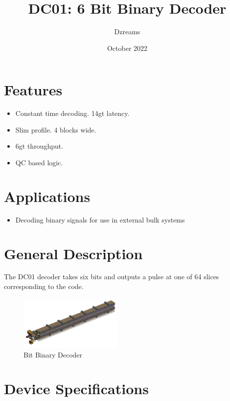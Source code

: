 \documentclass[10pt]{datasheet}
\title{DC01: 6 Bit Binary Decoder}
\author{Dzreams}
\date{October 2022}
\begin{document}
\maketitle

\section{Features}

\begin{itemize}
\item{Constant time decoding. 14gt latency.}
\item{Slim profile. 4 blocks wide.}
\item{6gt throughput.}
\item{QC based logic.}
\end{itemize}

\section{Applications}

\begin{itemize}
\item{Decoding binary signals for use in external bulk systems}
\end{itemize}

\section{General Description}
The DC01 decoder takes six bits and outputs a pulse at one of 64 slices corresponding to the code.
\vfill\break

\begin{figure}[h]
    \centering
    \includegraphics[width=0.45\textwidth]{6bit.png}
    \caption{ Bit Binary Decoder}
\end{figure}

\onecolumn

\section{Device Specifications}
\end{document}
